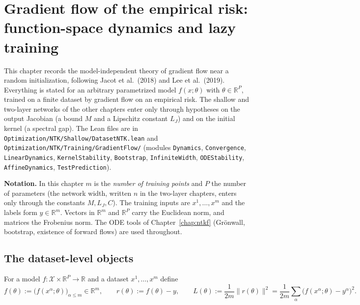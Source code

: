 \chapter{Gradient flow of the empirical risk: function-space dynamics and lazy training}\label{chap:ntkgf}

This chapter records the model-independent theory of gradient flow near a random initialization, following
Jacot et al.\ (2018) and Lee et al.\ (2019). Everything is stated for an arbitrary parametrized model
$f(x;\theta)$ with $\theta\in\mathbb R^P$, trained on a finite dataset by gradient flow on an empirical risk.
The shallow and two-layer networks of the other chapters enter only through hypotheses on the output
Jacobian (a bound $M$ and a Lipschitz constant $L_J$) and on the initial kernel (a spectral gap).
The Lean files are in \texttt{Optimization/NTK/Shallow/DatasetNTK.lean} and
\texttt{Optimization/NTK/Training/GradientFlow/} (modules \texttt{Dynamics}, \texttt{Convergence},
\texttt{LinearDynamics}, \texttt{KernelStability}, \texttt{Bootstrap}, \texttt{InfiniteWidth},
\texttt{ODEStability}, \texttt{AffineDynamics}, \texttt{TestPrediction}).

\medskip\noindent\textbf{Notation.}
In this chapter $m$ is the \emph{number of training points} and $P$ the number of parameters (the network
width, written $n$ in the two-layer chapters, enters only through the constants $M,L_J,C$).
The training inputs are $x^1,\dots,x^m$ and the labels form $y\in\mathbb R^m$. Vectors in $\mathbb R^m$ and
$\mathbb R^P$ carry the Euclidean norm, and matrices the Frobenius norm. The ODE tools of
Chapter~\ref{chap:ntkf} (Gr\"onwall, bootstrap, existence of forward flows) are used throughout.


\section{The dataset-level objects}\label{sec:ntkgf:setting}

\begin{definition}\label{def:ntkgf:outputs}
  \leanok
For a model $f:\mathcal X\times\mathbb R^P\to\mathbb R$ and a dataset $x^1,\dots,x^m$ define
\[
  f(\theta):=\bigl(f(x^\alpha;\theta)\bigr)_{\alpha\le m}\in\mathbb R^m,\qquad
  r(\theta):=f(\theta)-y,\qquad
  L(\theta):=\frac1{2m}\|r(\theta)\|^2=\frac1{2m}\sum_\alpha\bigl(f(x^\alpha;\theta)-y^\alpha\bigr)^2 .
\]
\end{definition}

